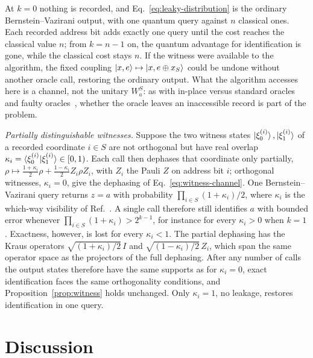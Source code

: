 \documentclass[
  aps,
  pra,
  reprint,
  nofootinbib
]{revtex4-2}
\begin{document}
At \(k=0\) nothing is recorded, and Eq.~\eqref{eq:leaky-distribution} is the
ordinary Bernstein--Vazirani output, with one quantum query against \(n\)
classical ones. Each recorded address bit adds exactly one query until the
cost reaches the classical value \(n\); from \(k=n-1\) on, the quantum
advantage for identification is gone, while the classical cost stays \(n\).
If the witness were available to the algorithm, the fixed coupling
\(\ket{x,e}\mapsto\ket{x,e\oplus x_S}\) could be undone without another oracle
call, restoring the ordinary output. What the algorithm accesses here is a
channel, not the unitary \(W_a^S\): as with in-place versus standard
oracles~\cite{KashefiKentVedralBanaszek2002} and faulty
oracles~\cite{RegevSchiff2008}, whether the oracle leaves an inaccessible
record is part of the problem.

\emph{Partially distinguishable witnesses.} Suppose the two witness states
\(\ket{\xi_0^{(i)}},\ket{\xi_1^{(i)}}\) of a recorded coordinate \(i\in S\) are not orthogonal but have real overlap
\(\kappa_i=\braket{\xi_0^{(i)}|\xi_1^{(i)}}\in[0,1)\). Each call then
dephases that coordinate only partially,
\(\rho\mapsto\frac{1+\kappa_i}{2}\rho+\frac{1-\kappa_i}{2}Z_i\rho Z_i\), with
\(Z_i\) the Pauli \(Z\) on address bit \(i\); orthogonal witnesses,
\(\kappa_i=0\), give the dephasing of Eq.~\eqref{eq:witness-channel}. One
Bernstein--Vazirani query returns \(z=a\) with probability
\(\prod_{i\in S}(1+\kappa_i)/2\), where \(\kappa_i\) is the which-way
visibility of Ref.~\cite{Englert1996}. A single call therefore still
identifies \(a\) with bounded error whenever
\(\prod_{i\in S}(1+\kappa_i)>2^{k-1}\), for instance for every \(\kappa_i>0\)
when \(k=1\). Exactness, however, is lost for every \(\kappa_i<1\). The
partial dephasing has the Kraus operators \(\sqrt{(1+\kappa_i)/2}\,I\) and
\(\sqrt{(1-\kappa_i)/2}\,Z_i\), which span the same operator space as the
projectors of the full dephasing. After any number of calls the output states
therefore have the same supports as for \(\kappa_i=0\), exact identification
faces the same orthogonality conditions, and Proposition~\ref{prop:witness}
holds unchanged. Only
\(\kappa_i=1\), no leakage, restores identification in one query.

\section{Discussion}
\label{sec:discussion}
\end{document}
